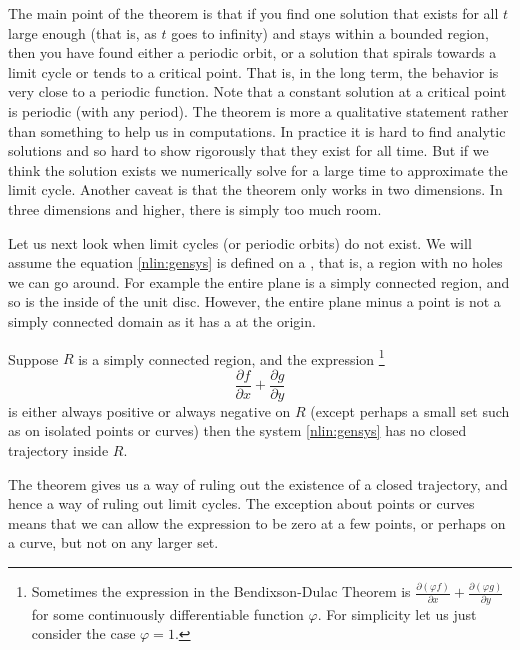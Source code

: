 \documentclass[12pt]{book}
\begin{document}
The main point of the theorem is that if you find one solution that exists
for all $t$ large enough (that is, as $t$ goes to infinity) and stays
within a bounded region, then
you have found either a periodic orbit, or a solution that spirals towards a
limit cycle or tends to a critical point.
That is, in the long term, the
behavior is very close to a periodic function.
Note that a constant solution at a critical point is periodic (with
any period).
The theorem is more a qualitative statement rather than
something to help us in computations.  In practice it is hard to find
analytic solutions and so hard to show rigorously that they exist for all
time.
But if we think the solution exists we numerically solve for a
large time to approximate the limit cycle.
Another caveat is that the theorem only works in two
dimensions.  In three dimensions and higher, there is simply too much room.

Let us next look when limit cycles (or periodic orbits) do not exist.
We will assume
the equation \eqref{nlin:gensys} is defined on a
\emph{}, that is, a region with no holes
we can go around.  For example the entire plane is a simply
connected region, and so is the inside of the unit disc.  However,
the entire plane minus a point is not a simply connected domain as it has a
 at the origin.

\begin{theorem}%
Suppose $R$ is a simply connected region,
and the expression%
\footnote{Sometimes the expression in the Bendixson-Dulac Theorem is
$\frac{\partial (\varphi f)}{\partial x} + \frac{\partial (\varphi
g)}{\partial y}$
for some continuously differentiable function $\varphi$.  For simplicity
let us just consider the case $\varphi = 1$.}
\begin{equation*}
\frac{\partial f}{\partial x} + \frac{\partial g}{\partial y}
\end{equation*}
is either always positive or always negative
on $R$ (except perhaps a small set such as on isolated points or curves)
then the system \eqref{nlin:gensys}
has no closed trajectory inside $R$.
\end{theorem}

The theorem gives us a way of ruling out the existence of a closed
trajectory, and hence a
way of ruling out limit cycles.
The exception about points or curves 
means that we can allow the expression to be zero at a few points,
or perhaps on a curve, but not on any larger set.
\end{document}

